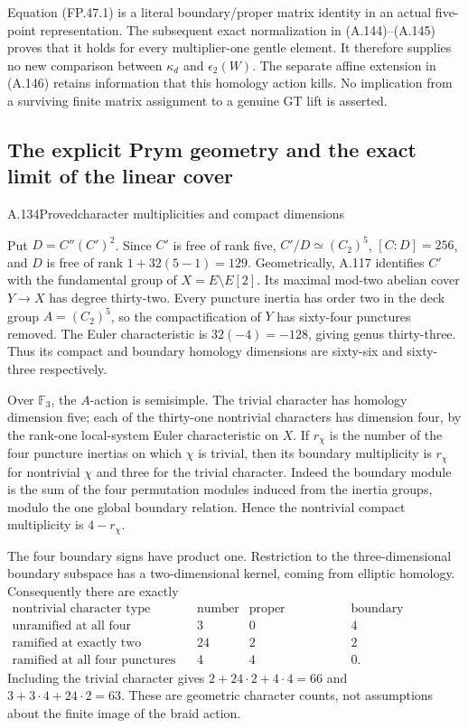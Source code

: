 Equation (FP.47.1) is a literal boundary/proper matrix identity
in an actual five-point representation. The subsequent exact
normalization in (A.144)--(A.145) proves that it holds for
every multiplier-one gentle element. It therefore supplies
no new comparison between $\kappa_d$ and $\epsilon_2(W)$.
The separate affine extension in (A.146) retains information
that this homology action kills. No implication from a
surviving finite matrix assignment to a genuine GT lift is
asserted.

\subsection{The explicit Prym geometry and the exact limit of the linear cover}


\begin{statement}{A.134}{Proved}{character multiplicities and compact dimensions}
\citep[Sections 2.9 and 2.15]{LitNakamuraTsunogaiYasuda2010}
\end{statement}
Put $D=C''(C')^2$. Since $C'$ is free of rank five,
$C'/D\simeq(C_2)^5$, $[C:D]=256$, and $D$ is free
of rank $1+32(5-1)=129$. Geometrically, A.117 identifies
$C'$ with the fundamental group of
$X=E\setminus E[2]$. Its maximal mod-two abelian cover
$Y\to X$ has degree thirty-two. Every puncture inertia
has order two in the deck group $A=(C_2)^5$, so the
compactification of $Y$ has sixty-four punctures removed.
The Euler characteristic is $32(-4)=-128$, giving genus
thirty-three. Thus its compact and boundary homology
dimensions are sixty-six and sixty-three respectively.

Over $\mathbb F_3$, the $A$-action is semisimple. The
trivial character has homology dimension five; each
of the thirty-one nontrivial characters has dimension
four, by the rank-one local-system Euler characteristic
on $X$. If $r_\chi$ is the number of the four puncture
inertias on which $\chi$ is trivial, then its boundary
multiplicity is $r_\chi$ for nontrivial $\chi$ and three
for the trivial character. Indeed the boundary module
is the sum of the four permutation modules induced from
the inertia groups, modulo the one global boundary
relation. Hence the nontrivial compact multiplicity is
$4-r_\chi$.

The four boundary signs have product one. Restriction
to the three-dimensional boundary subspace has a
two-dimensional kernel, coming from elliptic homology.
Consequently there are exactly
\[
\begin{array}{c|c|c|c}
\text{nontrivial character type}&\text{number}&
 \text{proper dimension}&\text{boundary dimension}\\ \hline
\text{unramified at all four punctures}&3&0&4\\
\text{ramified at exactly two punctures}&24&2&2\\
\text{ramified at all four punctures}&4&4&0.
\end{array}
 \tag{RP.1a}
\]
Including the trivial character gives
$2+24\cdot2+4\cdot4=66$ and
$3+3\cdot4+24\cdot2=63$. These are geometric
character counts, not assumptions about the finite
image of the braid action.

